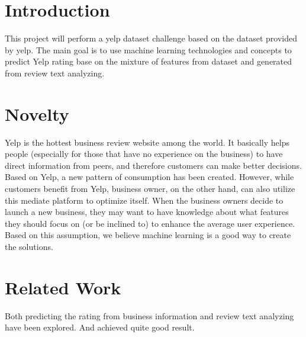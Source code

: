 \documentclass{article}
\begin{document}
 


\section{Introduction}


This project will perform a yelp dataset challenge based on the dataset provided by yelp. The main goal is to use machine learning technologies and concepts to predict Yelp rating base on the mixture of features from dataset and generated from review text analyzing. 

\section{Novelty}
Yelp is the hottest business review website among the world. It basically helps people (especially for those that have no experience on the business) to have direct information from peers, and therefore customers can make better decisions. Based on Yelp, a new pattern of consumption has been created. However, while customers benefit from Yelp, business owner, on the other hand, can also utilize this mediate platform to optimize itself. When the business owners decide to launch a new business, they may want to have knowledge about what features they should focus on (or be inclined to) to enhance the average user experience. Based on this assumption, we believe machine learning is a good way to create the solutions.

\section{Related Work}

Both predicting the rating from business information and review text analyzing have been explored. And achieved quite good result. 
\end{document}
